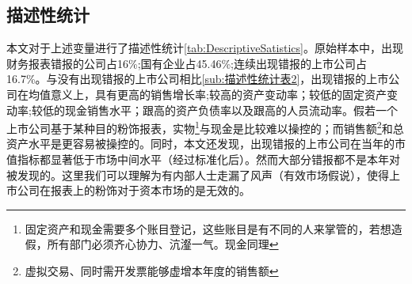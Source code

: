 \documentclass{article}
\begin{document}
\subsection{描述性统计}
本文对于上述变量进行了描述性统计\ref{tab:DescriptiveSatistics}。原始样本中，出现财务报表错报的公司占16\%;国有企业占45.46\%;连续出现错报的上市公司占16.7\%。与没有出现错报的上市公司相比\ref{sub:描述性统计表2}，出现错报的上市公司在均值意义上，具有更高的销售增长率;较高的资产变动率；较低的固定资产变动率;较低的现金销售水平；跟高的资产负债率以及跟高的人员流动率。假若一个上市公司基于某种目的粉饰报表，实物\footnote{固定资产和现金需要多个账目登记，这些账目是有不同的人来掌管的，若想造假，所有部门必须齐心协力、沆瀣一气。现金同理}与现金是比较难以操控的；而销售额\footnote{虚拟交易、同时需开发票能够虚增本年度的销售额}和总资产水平是更容易被操控的。同时，本文还发现，出现错报的上市公司在当年的市值指标都显著低于市场中间水平（经过标准化后）。然而大部分错报都不是本年对被发现的。这里我们可以理解为有内部人士走漏了风声（有效市场假说），使得上市公司在报表上的粉饰对于资本市场的是无效的。
\end{document}
